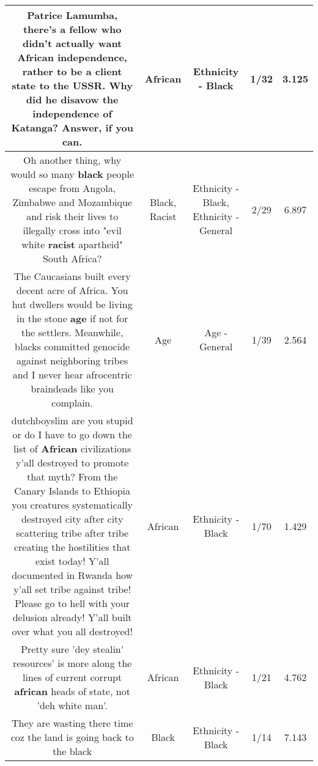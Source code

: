 \documentclass[11pt]{article}
\newlength\mylength
\begin{document}
\begin{center}
\begin{longtable}{|C{.65\mylength}|C{.30\mylength}|C{.12\mylength}|C{.12\mylength}|C{.12\mylength}|}
  \small Patrice Lamumba, there's a fellow who didn't actually want \textbf{African} independence, rather to be a client state to the USSR. Why did he disavow the independence of Katanga? Answer, if you can.\normalsize   & African & Ethnicity - Black & 1/32 & 3.125 \\  \hline
  \small Oh another thing, why would so many \textbf{black} people escape from Angola, Zimbabwe and Mozambique and risk their lives to illegally cross into "evil white \textbf{racist} apartheid" South Africa?\normalsize   & Black, Racist & Ethnicity - Black, Ethnicity - General & 2/29 & 6.897 \\  \hline
  \small The Caucasians built every decent acre of Africa. You hut dwellers would be living in the stone \textbf{age} if not for the settlers. Meanwhile, blacks committed genocide against neighboring tribes and I never hear afrocentric braindeads like you complain.\normalsize   & Age & Age - General & 1/39 & 2.564 \\  \hline
  \small dutchboyslim are you stupid or do I have to go down the list of \textbf{African} civilizations y'all destroyed to promote that myth? From the Canary Islands to Ethiopia you creatures systematically destroyed city after city scattering tribe after tribe creating the hostilities that exist today! Y'all documented in Rwanda how y'all set tribe against tribe! Please go to hell with your delusion already! Y'all built over what you all destroyed!\normalsize   & African & Ethnicity - Black & 1/70 & 1.429 \\  \hline
  \small Pretty sure 'dey stealin' resources' is more along the lines of current corrupt \textbf{african} heads of state, not 'deh white man'.\normalsize   & African & Ethnicity - Black & 1/21 & 4.762 \\  \hline
  \small They are wasting there time coz the land is going back to the black\normalsize   & Black & Ethnicity - Black & 1/14 & 7.143 \\  \hline

\end{longtable}
\end{center}
\end{document}
